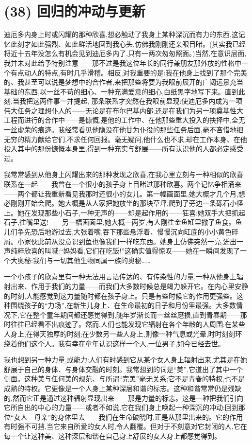 \section{(38) 回归的冲动与更新}

迪厄多内身上时或闪耀的那种欣喜,想必触动了我身上某种深沉而有力的东西,这记忆此刻才如此强烈、如此鲜活地回到我心头,仿佛我刚刚还亲眼目睹。(其实我已经将近十五年没怎么有机会见到迪厄多内了,只有一两次匆匆照面。)当然,在意识层面,我并未对此给予特别注意——那不过是我这位年长的同行兼朋友那外放的性格中一个有点动人的特点,有时几乎滑稽。相反,对我重要的是:我在他身上找到了那个完美的、我甚至可以说是梦想中的合作者,来把那些将要为我眼前展开的广阔远景充当基础的东西,以一丝不苟的细心、一种充满爱意的细心,白纸黑字地写下来。直到此刻,当我把这两件事一并提起,
 那条联系才突然在我眼前显现:使迪厄多内成为一项伟大任务之理想仆人的——无论是在布尔巴基内部,还是在我们为另一项奠基性大工程而进行的合作中——是慷慨,是他的工作中、在他那些重大投入的抉择中,全无一丝虚荣的痕迹。我经常看见他隐没在他甘为仆役的那些任务后面,毫不吝惜地把无穷的精力献给它们,不求任何回报。毫无疑问,他什么也不求,却在工作本身、在他投入其中的那份慷慨本身里,得到一种充实与舒展——所有认识他的人都必定感受过。

我常常感到从他身上闪耀出来的那种发现之欣喜,在我心里立刻与一种相似的欣喜联系在一起——我曾在一个很小的孩子身上目睹过那种欣喜。两个记忆争相涌来——两个都让我重新看见我那时还很小的女儿。第一幅画面里,她大概才几个月,想必刚刚开始会爬。她大概是从人家把她放坐的那块草坪,爬到了旁边一条砾石小径上。她在发现那些小石子,一种无声的——却是起作用的——狂喜:她双手大把抓起石子,往嘴里送!——另一幅画面里,她大概一两岁,有人刚往金鱼缸里撒了鱼食。鱼儿们争先恐后地游过去,大张着嘴,吞下那些悬浮着、慢慢沉向缸底的小小黄色碎屑。小家伙此前从没意识到鱼也像我们一样吃东西。她身上仿佛突然一亮,迸出一声纯粹欣喜的叫喊:“妈妈看,它们在吃饭!”这确实值得惊叹——她在一瞬间发现了一个大奥秘:我们与一切其他生物同属一族的奥秘……

 一个小孩子的欣喜里有一种无法用言语传达的、有传染性的力量,一种从他身上辐射出来、作用于我们的力量——而我们大多数时候总是竭力躲开它。在内心里安静的时刻,人能感觉到这力量随时都在孩子身上。只是有些时候它的作用更强些。这种围绕孩子的“力场”,在新生儿身上、在生命最初的日子和月份里最强。大多数情况下,它在整个童年期间都还感觉得到,随年岁渐长而一丝丝磨损,直到青春期——那时往往已经看不出痕迹了。然而,人们也能发现它辐射在各个年龄的人周围:在某些人身上,在得天独厚的时刻;在少数另一些人身上,则像一种气息或光晕,时时刻刻环绕着他们这个人。我有幸在童年认识这样一个人,一位男子,如今已经去世。

我也想到另一种力量,或能力:人们有时感到它从某个女人身上辐射出来,尤其是在她舒展于自己的身体、与身体交融的时刻。我常想到的词是“美”,它道出了其中一个侧面。这种美与任何美的规范、与所谓“完美”毫无关系;它不是青春的特权,也不是成熟的特权。它更像是一个人身上某种深层和谐的标志。这种和谐常常仍是残缺的,然而它正是通过这种辐射显现出来——那是力量的标志。这是一种把我们引向它所自出的中心的力量——或者不如说,它在我们身上唤起一种深沉的冲动:回到那位“女人—母亲”的身体里去——我们在生命破晓时,正是从那里出来的。它的作用有时强不可挡,当它来自所爱的女人时,令人翻覆。但对于不刻意对它封闭的人,它在每一个让这种美、这种深层和谐在自己身上舒展的女人身上都感觉得到。

